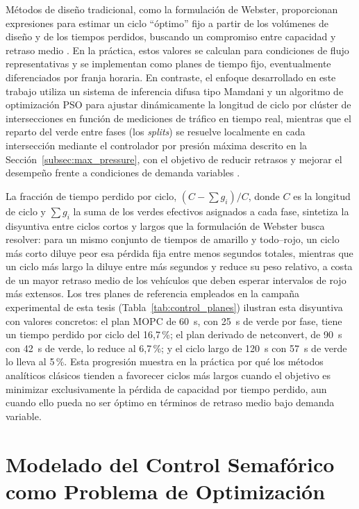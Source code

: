 Métodos de diseño tradicional, como la formulación de Webster, proporcionan expresiones para estimar un ciclo ``óptimo'' fijo a partir de los volúmenes de diseño y de los tiempos perdidos, buscando un compromiso entre capacidad y retraso medio \cite{webster1958traffic,fhwa2008signal}. En la práctica, estos valores se calculan para condiciones de flujo representativas y se implementan como planes de tiempo fijo, eventualmente diferenciados por franja horaria. En contraste, el enfoque desarrollado en este trabajo utiliza un sistema de inferencia difusa tipo Mamdani y un algoritmo de optimización PSO para ajustar dinámicamente la longitud de ciclo por clúster de intersecciones en función de mediciones de tráfico en tiempo real, mientras que el reparto del verde entre fases (los \emph{splits}) se resuelve localmente en cada intersección mediante el controlador por presión máxima descrito en la Sección~\ref{subsec:max_pressure}, con el objetivo de reducir retrasos y mejorar el desempeño frente a condiciones de demanda variables \cite{papageorgiou2003review,stevanovic2010adaptive}.

La fracción de tiempo perdido por ciclo, $(C - \sum g_i)/C$, donde $C$ es la longitud de ciclo y $\sum g_i$ la suma de los verdes efectivos asignados a cada fase, sintetiza la disyuntiva entre ciclos cortos y largos que la formulación de Webster busca resolver: para un mismo conjunto de tiempos de amarillo y todo--rojo, un ciclo más corto diluye peor esa pérdida fija entre menos segundos totales, mientras que un ciclo más largo la diluye entre más segundos y reduce su peso relativo, a costa de un mayor retraso medio de los vehículos que deben esperar intervalos de rojo más extensos. Los tres planes de referencia empleados en la campaña experimental de esta tesis (Tabla~\ref{tab:control_planes}) ilustran esta disyuntiva con valores concretos: el plan MOPC de 60~s, con 25~s de verde por fase, tiene un tiempo perdido por ciclo del 16,7\,\%; el plan derivado de netconvert, de 90~s con 42~s de verde, lo reduce al 6,7\,\%; y el ciclo largo de 120~s con 57~s de verde lo lleva al 5\,\%. Esta progresión muestra en la práctica por qué los métodos analíticos clásicos tienden a favorecer ciclos más largos cuando el objetivo es minimizar exclusivamente la pérdida de capacidad por tiempo perdido, aun cuando ello pueda no ser óptimo en términos de retraso medio bajo demanda variable.




\section{Modelado del Control Semafórico como Problema de Optimización}
\label{subsec:modelado_optimizacion}

